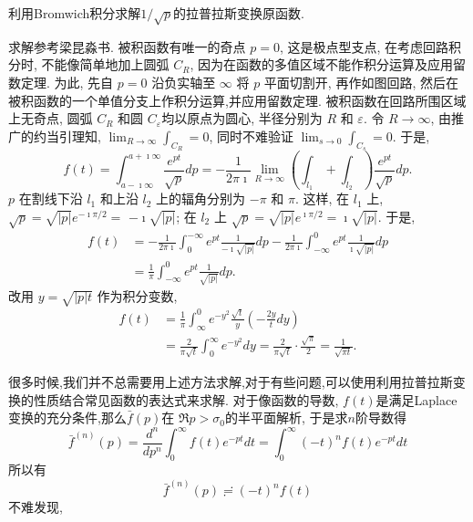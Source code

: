 \begin{example}
利用Bromwich积分求解$1/\sqrt{p}$的拉普拉斯变换原函数.
\end{example}
\begin{solution}
    求解参考梁昆淼书.
    被积函数有唯一的奇点 $p=0$, 这是极点型支点, 在考虑回路积分时, 
    不能像简单地加上圆弧 $C_R$, 因为在函数的多值区域不能作积分运算及应用留数定理. 
    为此, 先自 $p=0$ 沿负实轴至 $\infty$ 将 $p$ 平面切割开,
    再作如图回路, 然后在被积函数的一个单值分支上作积分运算,并应用留数定理. 
    被积函数在回路所围区域上无奇点,
     圆弧 $C_R$ 和圆 $C_{\varepsilon}$均以原点为圆心, 
     半径分别为 $R$ 和 $\varepsilon$. 令 $R \rightarrow \infty$, 
     由推广的约当引理知, $\lim _{R \rightarrow \infty} \int_{C_R}=0$, 
     同时不难验证 $\lim _{s \rightarrow 0} \int_{C_s}=0$.
     于是,
$$
f(t)=\int_{a-\imath \infty}^{a+\imath \infty} \frac{e^{p t}}{\sqrt{p}} d p=-\frac{1}{2 \pi \imath} \lim _{R \rightarrow \infty}\left(\int_{l_1}+\int_{l_2}\right) \frac{e^{p t}}{\sqrt{p}} d p .
$$
$p$ 在割线下沿 $l_1$ 和上沿 $l_2$ 上的辐角分别为 $-\pi$ 和 $\pi$. 这样, 在 $l_1$ 上, $\sqrt{p}=\sqrt{|p|} e^{-\imath \pi / 2}=$ $-\imath \sqrt{|p|}$; 在 $l_2$ 上 $\sqrt{p}=\sqrt{|p|} e^{\imath \pi / 2}=\imath \sqrt{|p|}$. 于是,
$$
\begin{aligned}
f(t) & =-\frac{1}{2 \pi \imath} \int_0^{-\infty} e^{p t} \frac{1}{-\imath \sqrt{|p|}} d p-\frac{1}{2 \pi \imath} \int_{-\infty}^0 e^{p t} \frac{1}{\imath \sqrt{|p|}} d p \\
& =\frac{1}{\pi} \int_{-\infty}^0 e^{p t} \frac{1}{\sqrt{|p|}} d p .
\end{aligned}
$$
改用 $y=\sqrt{|p| t}$ 作为积分变数,
$$
\begin{aligned}
f(t) & =\frac{1}{\pi} \int_{\infty}^0 e^{-y^2} \frac{\sqrt{t}}{y}\left(-\frac{2 y}{t} d y\right) \\
& =\frac{2}{\pi \sqrt{t}} \int_0^{\infty} e^{-y^2} d y=\frac{2}{\pi \sqrt{t}} \cdot \frac{\sqrt{\pi}}{2}=\frac{1}{\sqrt{\pi t}} .
\end{aligned}
$$
\end{solution}

很多时候,我们并不总需要用上述方法求解,对于有些问题,可以使用利用拉普拉斯变换的性质结合常见函数的表达式来求解.
对于像函数的导数, $f(t)$是满足Laplace变换的充分条件,那么$\bar{f}(p)$在
$\Re p > \sigma_0$的半平面解析,
于是求$n$阶导数得
\begin{equation}
\bar{f}^{(n)}(p)=\frac{d^{n}}{d p^n} \int_0^{\infty} f(t) e^{-p t} d t=\int_0^{\infty}(-t)^n f(t) e^{-p t} d t
\end{equation}
所以有
\begin{equation}
    \bar{f}^{(n)}(p)\risingdotseq (-t)^n f(t)
\end{equation}
不难发现,

